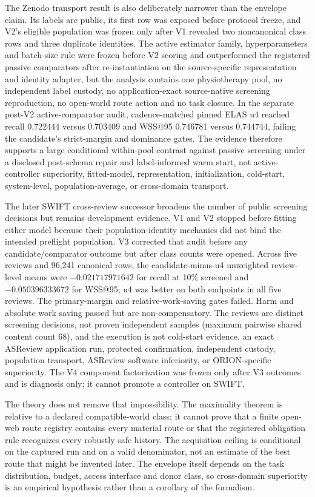 \documentclass[11pt]{article}
\theoremstyle{definition}
\begin{document}
The Zenodo transport result is also deliberately narrower than the envelope
claim.  Its labels are public, its first row was exposed before protocol freeze,
and V2's eligible population was frozen only after V1 revealed two
noncanonical class rows and three duplicate identities. The active estimator
family, hyperparameters and batch-size rule were frozen before V2 scoring and
outperformed the registered passive
comparators after re-instantiation on the source-specific representation and
identity adapter, but the
analysis contains one physiotherapy pool, no independent label custody, no
application-exact source-native screening reproduction, no open-world route
action and no task closure. In the separate post-V2 active-comparator audit,
cadence-matched pinned ELAS u4 reached recall 0.722444 versus 0.703409 and
WSS@95 0.746781 versus 0.744744, failing the candidate's strict-margin and
dominance gates. The evidence therefore supports a large conditional
within-pool contrast against passive screening under a disclosed post-schema
repair and label-informed warm start, not active-controller superiority,
fitted-model, representation, initialization, cold-start, system-level,
population-average, or cross-domain transport.

The later SWIFT cross-review successor broadens the number of public screening
decisions but remains development evidence.  V1 and V2 stopped before fitting
either model because their population-identity mechanics did not bind the
intended preflight population.  V3 corrected that audit before any
candidate/comparator outcome but after class counts were opened.  Across five
reviews and 96,241 canonical rows, the candidate-minus-u4 unweighted
review-level means were $-0.021717971642$ for recall at 10\% screened and
$-0.050396333672$ for WSS@95; u4 was better on both endpoints in all five
reviews.  The primary-margin and relative-work-saving gates failed.  Harm and
absolute work saving passed but are non-compensatory.  The reviews are distinct
screening decisions, not proven independent samples (maximum pairwise shared
content count 68), and the execution is not cold-start evidence, an exact
ASReview application run, protected confirmation, independent custody,
population transport, ASReview software inferiority, or ORION-specific
superiority.  The V4 component factorization was frozen only after V3 outcomes
and is diagnosis only; it cannot promote a controller on SWIFT.

The theory does not remove that impossibility.  The maximality theorem is
relative to a declared compatible-world class; it cannot prove that a finite
open-web route registry contains every material route or that the registered
obligation rule recognizes every robustly safe history.  The acquisition
ceiling is conditional on the captured run and on a valid denominator, not an
estimate of the best route that might be invented later.  The envelope itself
depends on the task distribution, budget, access interface and donor class, so
cross-domain superiority is an empirical hypothesis rather than a corollary of
the formalism.
\end{document}
